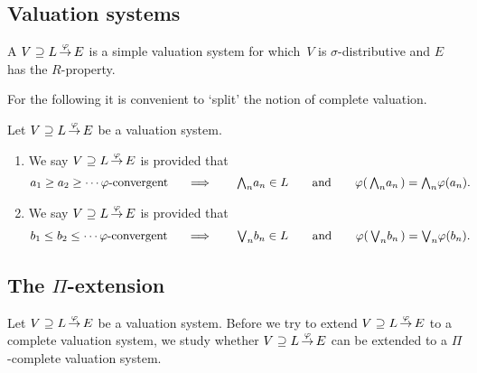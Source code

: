 \documentclass[main.tex]{subfiles}
\begin{document}
\subsection{Valuation systems}
\begin{dfn}
\label{D:system}
A  $V \supseteq L\,\smash{\stackrel{\varphi}{\rightarrow}}\,E$
is a simple valuation system
for which~$V$ is $\sigma$-distributive
and $E$ has the $R$-property.
\end{dfn}

For the following it is convenient to `split' the notion
of complete valuation.
\begin{dfn}
\label{D:system-complete2}
Let $V \supseteq L\,\smash{\stackrel{\varphi}{\rightarrow}}\,E$ be
a valuation system.
\begin{enumerate}
\item
We say $V \supseteq L\,\smash{\stackrel{\varphi}{\rightarrow}}\,E$ is 
provided that
\begin{alignat*}{5}
a_1 \geq a_2 \geq \dotsb \text{$\varphi$-convergent }
  \quad &\implies \quad 
  & \textstyle{\bigwedge}_n a_n &\in L\quad 
  &&\text{and}\quad
  &\varphi(\,\textstyle{\bigwedge}_n a_n\,) &= \textstyle{\bigwedge}_n \varphi(a_n). 
\end{alignat*}
\item
We say $V \supseteq L\,\smash{\stackrel{\varphi}{\rightarrow}}\,E$ is 
provided that
\begin{alignat*}{5}
b_1 \leq b_2 \leq \dotsb \text{$\varphi$-convergent }
  \quad &\implies \quad 
  & \textstyle{\bigvee}_n b_n &\in L\quad 
  &&\text{and}\quad
  &\varphi(\,\textstyle{\bigvee}_n b_n\,) &= \textstyle{\bigvee}_n \varphi(b_n). 
\end{alignat*}

\end{enumerate}
\end{dfn}

%
%

\subsection{The $\Pi$-extension}
Let $V \supseteq L\,\smash{\stackrel{\varphi}{\rightarrow}}\,E$ be a valuation system.
Before we try to extend $V \supseteq L\,\smash{\stackrel{\varphi}{\rightarrow}}\,E$ to a complete
valuation system, 
we study whether $V \supseteq L\,\smash{\stackrel{\varphi}{\rightarrow}}\,E$
can be extended to a $\Pi$-complete valuation system.
\end{document}
